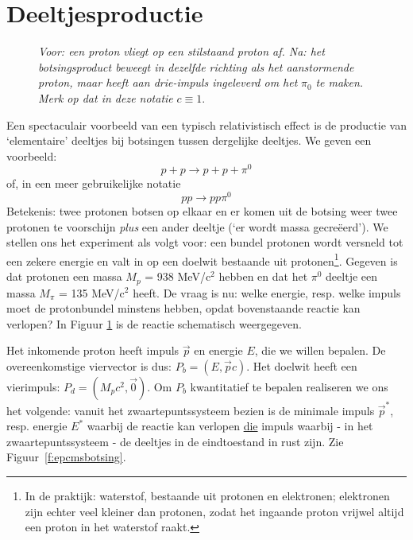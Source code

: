 \section{Deeltjesproductie}


\begin{figure}[ht]
\centering
\caption{{\sl Voor: een proton vliegt op een stilstaand proton af. Na: het botsingsproduct beweegt in dezelfde richting als het aanstormende proton, maar heeft aan drie-impuls ingeleverd om het} $\pi_0$ {\sl te maken. Merk op dat in deze notatie } $c\equiv 1$.}
\label{f:epbotsing}
\end{figure}


Een spectaculair voorbeeld van een typisch relativistisch effect is de
productie van
`elementaire' deeltjes bij botsingen tussen dergelijke deeltjes.
We geven een voorbeeld:
\begin{displaymath}
p + p \rightarrow p + p + \pi^{0}
\end{displaymath}
of, in een meer gebruikelijke notatie
\begin{displaymath}
pp \rightarrow pp\pi^{0}
\end{displaymath}
Betekenis:
twee protonen botsen op elkaar en er komen uit de botsing weer twee protonen
te voorschijn \textit{plus} een ander deeltje (`er wordt massa
gecre\"{e}erd').
We stellen ons het experiment als volgt voor:
een bundel protonen wordt versneld tot een zekere energie en valt in op een
doelwit bestaande uit protonen\footnote{In de praktijk: waterstof, bestaande uit protonen en elektronen;
elektronen zijn echter veel kleiner dan protonen, zodat het ingaande proton
vrijwel altijd een proton in het waterstof raakt.}.
Gegeven is dat protonen een massa $M_{p}$ = 938 MeV/c$^{2}$ hebben en dat het
$\pi^{0}$ deeltje een massa $M_{\pi}$ = 135 MeV/c$^{2}$ heeft.
De vraag is nu: welke energie, resp. welke impuls moet de protonbundel
minstens hebben, opdat bovenstaande reactie kan verlopen?
In Figuur \ref{f:epbotsing} is de reactie schematisch weergegeven.

Het inkomende proton heeft impuls $\vec{p}$ en energie $E$, die we willen
bepalen.
De overeenkomstige viervector is dus:
$P_{b} = (E, \vec{p}c)$.
Het doelwit heeft een vierimpuls: $P_{d} = (M_{p}c^{2},\vec{0})$.
Om  $P_{b}$ kwantitatief te bepalen realiseren we ons het volgende: vanuit het
zwaartepuntssysteem bezien is de minimale impuls $\vec{p}^{*}$, resp. energie
$E^{*}$ waarbij de reactie kan verlopen \underline{die} impuls waarbij - in het
zwaartepuntssysteem - de deeltjes in de eindtoestand in rust zijn.
Zie Figuur~\ref{f:epcmsbotsing}.

